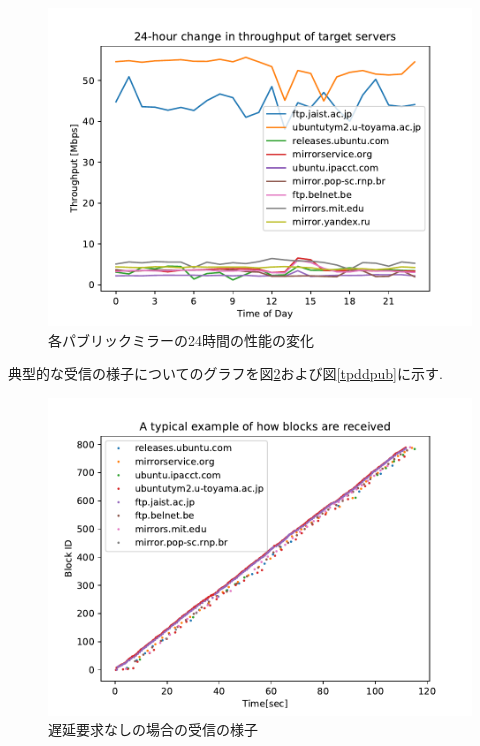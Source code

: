 \documentclass[a4j,12pt]{gradthesis_utf8}
\begin{document}
\newpage

\begin{figure}[ht]
    \begin{center}
        \includegraphics[width=15cm]{figure/thp24h.pdf}
        \caption{各パブリックミラーの24時間の性能の変化}
        \label{24h}
    \end{center}
\end{figure}

\newpage

典型的な受信の様子についてのグラフを図\ref{tpdnpub}および図\ref{tpddpub}に示す.

\begin{figure}[ht]
	\begin{center}
		\includegraphics[width=11.9cm]{figure/TypicalPlotDelay=NORMALInit=FalseDup=IBRC.pdf}
		\caption{遅延要求なしの場合の受信の様子}
		\label{tpdnpub}
	\end{center}
\end{figure}
\end{document}
